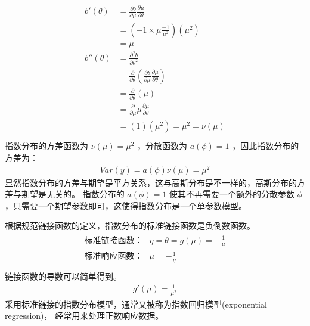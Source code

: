 \documentclass[letterpaper,10pt,english]{sphinxmanual}
\begin{document}
\begin{align}\label{equation:指数模型/content:指数模型/content:9}\!\begin{aligned}
b'(\theta) &= \frac{\partial b}{\partial \mu} \frac{\partial \mu}{\partial \theta}\\
&= \left (-1 \times \mu \frac{-1}{\mu^2} \right )( \mu^2)\\
&= \mu\\
b''(\theta) &= \frac{\partial^2 b}{\partial \theta^2}\\
&= \frac{\partial }{\partial \theta} \left ( \frac{\partial b}{\partial \mu} \frac{\partial \mu}{\partial \theta} \right )\\
&= \frac{\partial }{\partial \theta}(\mu)\\
&= \frac{\partial }{\partial \mu} \mu \frac{\partial \mu}{\partial \theta}\\
&= (1)(\mu^2)=\mu^2 = \nu(\mu)\\
\end{aligned}\end{align}
指数分布的方差函数为 \(\nu(\mu)=\mu^2\)
，分散函数为 \(a(\phi)=1\)
，因此指数分布的方差为：
\begin{equation}\label{equation:指数模型/content:指数模型/content:10}
\begin{split}Var(y) = a(\phi)\nu(\mu) = \mu^2\end{split}
\end{equation}
显然指数分布的方差与期望是平方关系，这与高斯分布是不一样的，高斯分布的方差与期望是无关的。
指数分布的 \(a(\phi)=1\) 使其不再需要一个额外的分散参数 \(\phi\)
，只需要一个期望参数即可，这使得指数分布是一个单参数模型。

根据规范链接函数的定义，指数分布的标准链接函数是负倒数函数。
\begin{align}\label{equation:指数模型/content:指数模型/content:11}\!\begin{aligned}
\text{标准链接函数：} &\eta=\theta=g(\mu) = - \frac{1}{\mu}\\
\text{标准响应函数：} &\mu = - \frac{1}{\eta}\\
\end{aligned}\end{align}
链接函数的导数可以简单得到。
\begin{equation}\label{equation:指数模型/content:指数模型/content:12}
\begin{split}g'(\mu) = \frac{1}{\mu^2}\end{split}
\end{equation}
采用标准链接的指数分布模型，通常又被称为指数回归模型(exponential regression)，
经常用来处理正数响应数据。
\end{document}
